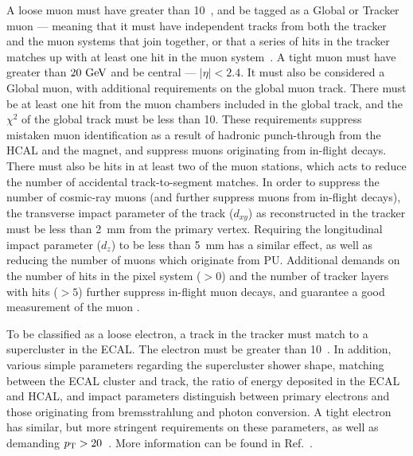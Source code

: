 A loose muon must have \pt{} greater than 10~\GeV{}, and be tagged as a Global or Tracker muon --- meaning that it must
have independent tracks from both the tracker and the muon systems that join together, or that a series of hits in the tracker matches up with at least one hit in the muon system~\cite{CMS-PAPER-MUO-10-004}. 
%
A tight muon must have \pt\,greater than $20~\mathrm{GeV}$ and be central --- $|\eta|<2.4$. 
It must also be considered a Global muon, with additional requirements on the global muon track. 
There must be at least one hit from the muon chambers included in the global track, and the $\chi^{2}$ of the global track must be less than 10. These requirements suppress mistaken muon identification as a result of hadronic punch-through from the \ac{HCAL} and the magnet, and suppress muons originating from in-flight decays.
There must also be hits in at least two of the muon stations, which acts to reduce the number of accidental track-to-segment matches.
In order to suppress the number of cosmic-ray muons (and further suppress muons from in-flight decays), the transverse impact parameter of the track ($d_{xy}$) as reconstructed in the tracker must be less than 2~mm from the primary vertex. 
Requiring the longitudinal impact parameter ($d_{z}$) to be less than 5~mm has a similar effect, as well as reducing the number of muons which originate from \ac{PU}.
Additional demands on the number of hits in the pixel system ($>0$) and the number of tracker layers with hits ($>5$) further suppress in-flight muon decays, and guarantee a good measurement of the muon \pt{}.

To be classified as a loose electron, a track in the tracker must match to a supercluster in the \ac{ECAL}. 
The electron \pt must be greater than 10~\GeV{}. 
In addition, various simple parameters regarding the supercluster shower shape, matching between the \ac{ECAL} cluster and track, 
the ratio of energy deposited in the \ac{ECAL} and \ac{HCAL}, and impact parameters distinguish between primary electrons and those originating from bremsstrahlung and photon conversion. 
A tight electron has similar, but more stringent requirements on these parameters, as well as demanding $p_{\text{T}}>20$~\GeV. 
More information can be found in Ref.~\cite{CMS:elecReco}.

